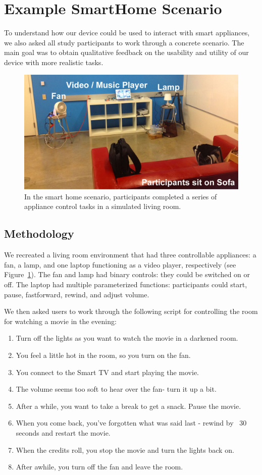 \section{Example SmartHome Scenario}
To understand how our device could be used to interact with smart appliances, we also asked all study participants to work through a concrete scenario. The main goal was to obtain qualitative feedback on the usability and utility of our device with more realistic tasks.

\begin{figure}[t]
\centering
\includegraphics[width=1.0\columnwidth]{figures/smarthome-scenario.jpg}
\caption{In the smart home scenario, participants completed a series of appliance control tasks in a simulated living room.}
\label{fig:smarthome}
\end{figure}

\subsection{Methodology}
We recreated a living room environment that had three controllable appliances: a fan, a lamp, and one laptop functioning as a video player, respectively (see Figure~\ref{fig:smarthome}). The fan and lamp had binary controls: they could be switched on or off. The laptop had multiple parameterized functions: participants could start, pause, fastforward, rewind, and adjust volume.

We then asked users to work through the following script for controlling the room for watching a movie in the evening:
{\small
\begin{enumerate}
\item Turn off the lights as you want to watch the movie in a darkened room.
\item You feel a little hot in the room, so you turn on the fan.
\item You connect to the Smart TV and start playing the movie. 
\item The volume seems too soft to hear over the fan- turn it up a bit. 
\item After a while, you want to take a break to get a snack. Pause the movie. 
\item When you come back, you've forgotten what was said last - rewind by ~30 seconds and restart the movie. 
\item When the credits roll, you stop the movie and turn the lights back on.
\item After awhile, you turn off the fan and leave the room.
\end{enumerate}
}

